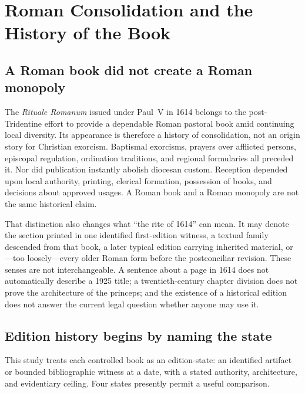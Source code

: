 \section{Roman Consolidation and the History of the Book}

\subsection{A Roman book did not create a Roman monopoly}

The \emph{Rituale Romanum} issued under Paul~V in 1614 belongs to the
post-Tridentine effort to provide a dependable Roman pastoral book amid
continuing local diversity. Its appearance is therefore a history of
consolidation, not an origin story for Christian exorcism. Baptismal
exorcisms, prayers over afflicted persons, episcopal regulation, ordination
traditions, and regional formularies all preceded it. Nor did publication
instantly abolish diocesan custom. Reception depended upon local authority,
printing, clerical formation, possession of books, and decisions about
approved usages. A Roman book and a Roman monopoly are not the same historical
claim.

That distinction also changes what ``the rite of 1614'' can mean. It may
denote the section printed in one identified first-edition witness, a textual
family descended from that book, a later typical edition carrying inherited
material, or---too loosely---every older Roman form before the
postconciliar revision. These senses are not interchangeable. A sentence
about a page in 1614 does not automatically describe a 1925 title; a
twentieth-century chapter division does not prove the architecture of the
princeps; and the existence of a historical edition does not answer the
current legal question whether anyone may use it.

\subsection{Edition history begins by naming the state}

This study treats each controlled book as an edition-state: an identified
artifact or bounded bibliographic witness at a date, with a stated authority,
architecture, and evidentiary ceiling. Four states presently permit a useful
comparison.

